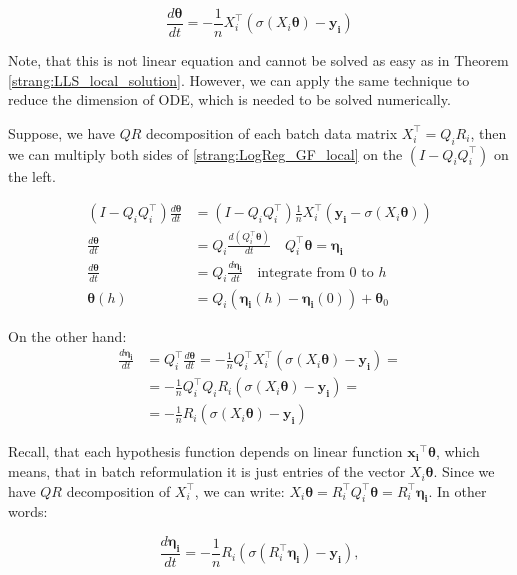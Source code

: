 \documentclass{article}
\newcommand{\vect}[1]{\boldsymbol{\mathbf{#1}}}
\begin{document}
\begin{equation}\label{strang:LogReg_GF_local}
\frac{d \vect{\theta}}{d t} =  - \frac{1}{n} X_i^\top\left(\sigma\left(X_i\vect{\theta}\right) - \vect{y_i}\right)
\end{equation}

Note, that this is not linear equation and cannot be solved as easy as in Theorem \ref{strang:LLS_local_solution}. However, we can apply the same technique to reduce the dimension of ODE, which is needed to be solved numerically. 

Suppose, we have $QR$ decomposition of each batch data matrix $X_i^\top = Q_i R_i$, then we can multiply both sides of \eqref{strang:LogReg_GF_local} on the $(I - Q_iQ_i^\top)$ on the left. 

\begin{align}
\nonumber (I - Q_iQ_i^\top)\frac{d \vect{\theta}}{d t} &= (I - Q_iQ_i^\top) \frac{1}{n} X_i^\top(\vect{y_i} -\sigma\left(X_i\vect{\theta}\right)) \\
\nonumber \frac{d \vect{\theta}}{d t} &= Q_i\frac{d (Q_i^\top\vect{\theta})}{d t} \quad Q_i^\top \vect{\theta} = \vect{\eta_i}\\ 
\nonumber \frac{d \vect{\theta}}{d t} &= Q_i\frac{d \vect{\eta_i}}{d t} \quad \text{integrate from $0$ to $h$}\\ 
\label{strang:logreg_theta_from_eta}\vect{\theta}(h) &= Q_i \left(\vect{\eta_i}(h) - \vect{\eta_i}(0) \right) + \vect{\theta}_0
\end{align}

On the other hand:
\begin{align}\nonumber
\frac{d \vect{\eta_i}}{d t} &= Q_i^\top\frac{d \vect{\theta}}{d t} =  - \frac{1}{n} Q_i^\top  X_i^\top(\sigma\left(X_i\vect{\theta}\right) - \vect{y_i}) = \\ 
\nonumber&= - \frac{1}{n} Q_i^\top  Q_i R_i(\sigma\left(X_i\vect{\theta}\right) - \vect{y_i}) =\\
\nonumber&= - \frac{1}{n} R_i(\sigma\left(X_i\vect{\theta}\right) - \vect{y_i})
\end{align}

Recall, that each hypothesis function depends on linear function $\vect{x_i}^\top \vect{\theta}$, which means, that in batch reformulation it is just entries of the vector $X_i \vect{\theta}$. Since we have $QR$ decomposition of $X_i^\top$, we can write: $X_i \vect{\theta} = R_i^\top Q_i^\top \vect{\theta} = R_i^\top \vect{\eta_i}$. In other words:

\begin{equation}
\label{strang:logreg_eta_ode}
\frac{d \vect{\eta_i}}{d t} = - \frac{1}{n} R_i\left(\sigma\left(R_i^\top \vect{\eta_i}\right) - \vect{y_i}\right),
\end{equation}
\end{document}
